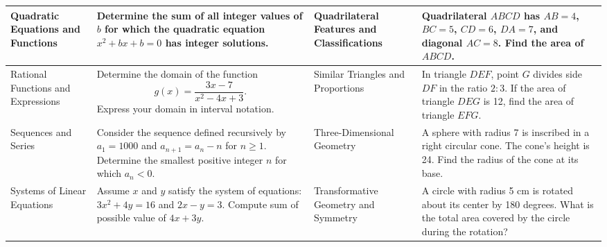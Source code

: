 \begin{table*}[htbp]
{\begin{tabular}{M{3cm}|M{5cm}|M{3cm}|M{5cm}}
    \midrule
    Quadratic Equations and Functions & Determine the sum of all integer values of $b$ for which the quadratic equation $x^2 + bx + b = 0$ has integer solutions. & Quadrilateral Features and Classifications & Quadrilateral $ABCD$ has $AB = 4$, $BC = 5$, $CD = 6$, $DA = 7$, and diagonal $AC = 8$. Find the area of $ABCD$. \\
    
    \midrule
    Rational Functions and Expressions & Determine the domain of the function $$g(x) = \frac{3x-7}{x^2 - 4x + 3}.$$ Express your domain in interval notation. & Similar Triangles and Proportions & In triangle $DEF$, point $G$ divides side $DF$ in the ratio $2:3$. If the area of triangle $DEG$ is 12, find the area of triangle $EFG$.\\
    
    \midrule
    Sequences and Series & Consider the sequence defined recursively by $a_1 = 1000$ and $a_{n+1} = a_n - n$ for $n \geq 1$. Determine the smallest positive integer $n$ for which $a_n < 0$. & Three-Dimensional Geometry & A sphere with radius 7 is inscribed in a right circular cone. The cone's height is 24. Find the radius of the cone at its base. \\

    \midrule
    Systems of Linear Equations & Assume $x$ and $y$ satisfy the system of equations: $3x^2 + 4y = 16$ and $2x - y = 3$. Compute sum of possible value of $4x + 3y$. & Transformative Geometry and Symmetry & A circle with radius 5 cm is rotated about its center by 180 degrees. What is the total area covered by the circle during the rotation? \\
    \bottomrule
  \end{tabular}%
  }
\end{table*}